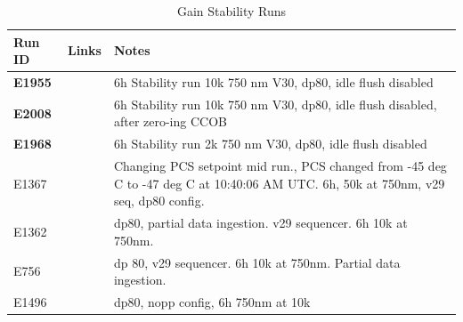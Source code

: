\begin{table}[H]\label{table:runs_gainStability}
\centering
\caption{Gain Stability Runs}
\begin{tabular}{|p{1.5cm}|p{2.9cm}|p{9cm}|}
\hline
Run ID & Links & Notes \\ \hline
\textbf{E1955} & & 6h Stability run 10k 750 nm V30, dp80, idle flush disabled\\ \hline
\textbf{E2008} & & 6h Stability run 10k 750 nm V30, dp80, idle flush disabled, after zero-ing CCOB\\ \hline
\textbf{E1968} & & 6h Stability run 2k 750 nm V30, dp80, idle flush disabled\\ \hline
E1367 & & Changing PCS setpoint mid run., PCS changed from -45 deg C to -47 deg C at 10:40:06 AM UTC. 6h, 50k at 750nm, v29 seq, dp80 config. \\ \hline
E1362 & & dp80, partial data ingestion. v29 sequencer. 6h 10k at 750nm. \\ \hline
E756 & & dp 80, v29 sequencer. 6h 10k at 750nm. Partial data ingestion.\\ \hline
E1496 & & dp80, nopp config, 6h 750nm at 10k\\ \hline
\end{tabular}
\end{table}

